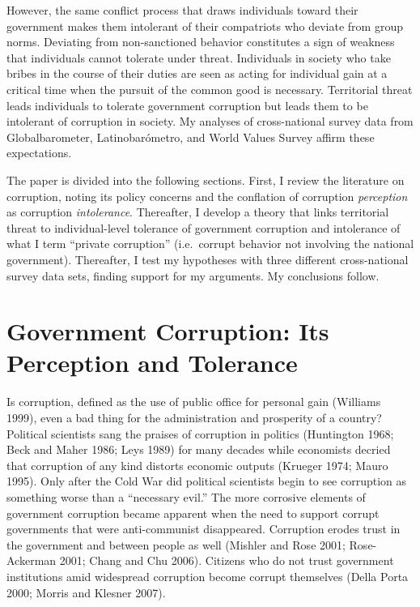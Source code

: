 \documentclass[11pt,]{article}
\begin{document}
However, the same conflict process that draws individuals toward their
government makes them intolerant of their compatriots who deviate from
group norms. Deviating from non-sanctioned behavior constitutes a sign
of weakness that individuals cannot tolerate under threat. Individuals
in society who take bribes in the course of their duties are seen as
acting for individual gain at a critical time when the pursuit of the
common good is necessary. Territorial threat leads individuals to
tolerate government corruption but leads them to be intolerant of
corruption in society. My analyses of cross-national survey data from
Globalbarometer, Latinobarómetro, and World Values Survey affirm these
expectations.

The paper is divided into the following sections. First, I review the
literature on corruption, noting its policy concerns and the conflation
of corruption \emph{perception} as corruption \emph{intolerance}.
Thereafter, I develop a theory that links territorial threat to
individual-level tolerance of government corruption and intolerance of
what I term ``private corruption'' (i.e.~corrupt behavior not involving
the national government). Thereafter, I test my hypotheses with three
different cross-national survey data sets, finding support for my
arguments. My conclusions follow.

\section{Government Corruption: Its Perception and
Tolerance}\label{government-corruption-its-perception-and-tolerance}

Is corruption, defined as the use of public office for personal gain
(Williams 1999), even a bad thing for the administration and prosperity
of a country? Political scientists sang the praises of corruption in
politics (Huntington 1968; Beck and Maher 1986; Leys 1989) for many
decades while economists decried that corruption of any kind distorts
economic outputs (Krueger 1974; Mauro 1995). Only after the Cold War did
political scientists begin to see corruption as something worse than a
``necessary evil.'' The more corrosive elements of government corruption
became apparent when the need to support corrupt governments that were
anti-communist disappeared. Corruption erodes trust in the government
and between people as well (Mishler and Rose 2001; Rose-Ackerman 2001;
Chang and Chu 2006). Citizens who do not trust government institutions
amid widespread corruption become corrupt themselves (Della Porta 2000;
Morris and Klesner 2007).
\end{document}
